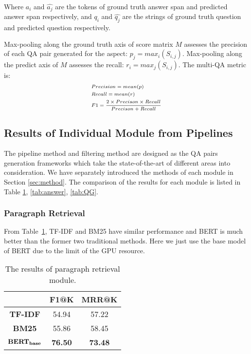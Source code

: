 Where $a_i$ and $\hat{a_j}$ are the tokens of ground truth answer span and predicted answer span respectively, and $q_i$ and $\hat{q_j}$ are the strings of ground truth question and predicted question respectively.

Max-pooling along the ground truth axis of score matrix $M$ assesses the precision of each QA pair generated for the aspect: $p_j=max_i(S_{i,j})$.
Max-pooling along the predict axis of $M$ assesses the recall:  $r_i=max_j(S_{i,j})$.
The multi-QA metric is:
\begin{equation}
\scriptsize
\begin{split}
&Precision=mean(p)\\
&Recall=mean(r)\\
&F1=\frac{2\times Precison\times Recall}{Precison+Recall}
\end{split}
\end{equation}

\subsection{Results of Individual Module from Pipelines}
The pipeline method and filtering method are designed as the QA pairs generation frameworks which take the state-of-the-art of different areas into consideration.
We have separately introduced the methods of each module in Section \ref{sec:method}.
The comparison of the results for each module is listed in Table \ref{tab:retrieval}, \ref{tab:answer}, \ref{tab:QG}.

\subsubsection{Paragraph Retrieval}
From Table~\ref{tab:retrieval}, TF-IDF and BM25 have similar performance and BERT is much better than the former two traditional methods. Here we just use the base model of BERT due to the limit of the GPU resource. 

\begin{table}[th]
\small
\centering
\begin{tabular}{ccc}
\hline
\textbf{} & \textbf{F1@K} & \textbf{MRR@K} \\ \hline\hline
\textbf{TF-IDF} & 54.94 & 57.22 \\ 
\textbf{BM25} & 55.86 & 58.45 \\ 
$\text{\textbf{BERT}}_{\text{\textbf{base}}}$ & \textbf{76.50} & \textbf{73.48} \\ \hline
\end{tabular}
\caption{\label{tab:retrieval} The results of paragraph retrieval module.}
\end{table}



